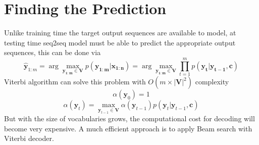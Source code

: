 \section{Finding the Prediction}
Unlike training time the target output sequences are available to model, at testing time seq2seq model must be able to predict the appropriate output sequences\cite{sutskever2014sequence}, this can be done via
\begin{equation}
\hat{\mathbf{y}}_{1:m} = \arg\max_{\mathbf{y_{1:m}} \in \mathbf{{V}}} p(\mathbf{y_{1:m}}|\mathbf{x_{1:n}}) = \arg\max_{\mathbf{y_{1:m}}\in \mathbf{{V}}} \prod_{t=1}^{m}p(\mathbf{y_{t}}|\mathbf{y_{t-1}},\mathbf{c})
\end{equation}
Viterbi algorithm can solve this problem with $O(m\times |\mathbf{{V}}|^{2})$ complexity\cite{viterbi1967error}
\begin{equation}
\alpha(\mathbf{y}_{0}) = 1
\end{equation}
\begin{equation}\label{Viterbi}
\alpha(\mathbf{y}_{t}) = \max_{\mathbf{y}_{t-1}\in\mathbf{{V}}}\alpha(\mathbf{y}_{t-1})p(\mathbf{y}_{t}|\mathbf{y}_{t-1},\mathbf{c})
\end{equation}
But with the size of vocabularies grows, the computational cost for decoding will become very expensive.
A much efficient approach is to apply Beam search with Viterbi decoder\cite{koehn2009statistical}. 
